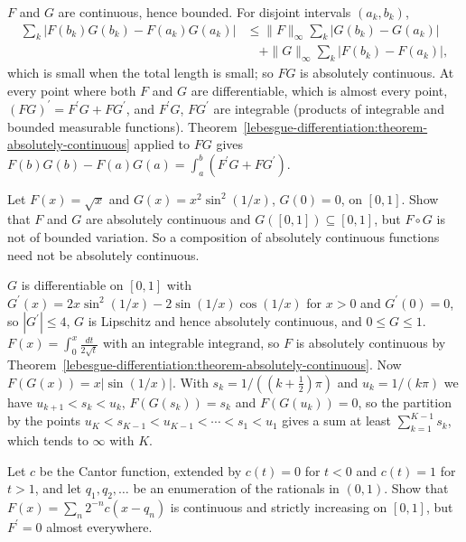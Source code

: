 \begin{solution}
$F$ and $G$ are continuous, hence bounded. For disjoint intervals $(a_k, b_k)$,
\[\begin{aligned}
\sum_k|F(b_k)G(b_k) - F(a_k)G(a_k)| &\leq \|F\|_\infty\sum_k|G(b_k) - G(a_k)| \\
&\quad + \|G\|_\infty\sum_k|F(b_k) - F(a_k)|,
\end{aligned}\]
which is small when the total length is small; so $FG$ is absolutely continuous. At every point
where both $F$ and $G$ are differentiable, which is almost every point, $(FG)^{\prime} = F^{\prime}G + FG^{\prime}$, and $F^{\prime}G$, $FG^{\prime}$ are integrable (products of integrable and bounded
measurable functions). Theorem~\ref{lebesgue-differentiation:theorem-absolutely-continuous} applied to $FG$ gives $F(b)G(b) - F(a)G(a) = \int_a^b(F^{\prime}G + FG^{\prime})$.
\end{solution}

\begin{exercise}\label{lebesgue-differentiation:exercise-composition-ac}
Let $F(x) = \sqrt{x}$ and $G(x) = x^2\sin^2(1/x)$, $G(0) = 0$, on $[0, 1]$. Show that $F$ and $G$ are absolutely continuous and $G([0, 1]) \subseteq [0, 1]$, but $F \circ G$ is not of bounded variation. So a
composition of absolutely continuous functions need not be absolutely continuous.
\end{exercise}

\begin{solution}
$G$ is differentiable on $[0, 1]$ with $G^{\prime}(x) = 2x\sin^2(1/x) - 2\sin(1/x)\cos(1/x)$ for $x > 0$ and $G^{\prime}(0) = 0$, so $|G^{\prime}| \leq 4$, $G$ is Lipschitz and hence absolutely continuous, and
$0 \leq G \leq 1$. $F(x) = \int_0^x\frac{dt}{2\sqrt t}$ with an integrable integrand, so $F$ is absolutely continuous by Theorem~\ref{lebesgue-differentiation:theorem-absolutely-continuous}. Now
$F(G(x)) = x|\sin(1/x)|$. With $s_k = 1/((k + \frac12)\pi)$ and $u_k = 1/(k\pi)$ we have $u_{k+1} < s_k < u_k$, $F(G(s_k)) = s_k$ and $F(G(u_k)) = 0$, so the partition by the points $u_K < s_{K-1} < u_{K-1} < \cdots < s_1 < u_1$
gives a sum at least $\sum_{k=1}^{K-1}s_k$, which tends to $\infty$ with $K$.
\end{solution}

\begin{exercise}\label{lebesgue-differentiation:exercise-strictly-singular}
Let $c$ be the Cantor function, extended by $c(t) = 0$ for $t < 0$ and $c(t) = 1$ for $t > 1$, and let $q_1, q_2, \ldots$ be an enumeration of the rationals in $(0, 1)$. Show that
$F(x) = \sum_n2^{-n}c(x - q_n)$ is continuous and strictly increasing on $[0, 1]$, but $F^{\prime} = 0$ almost everywhere.
\end{exercise}

